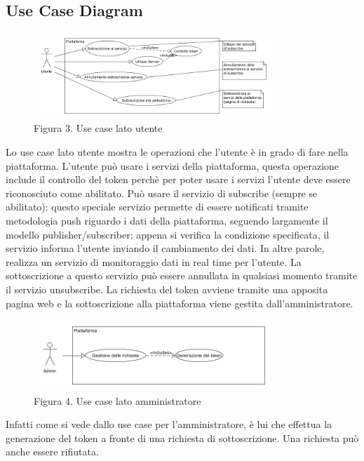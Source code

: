 \subsection{Use Case Diagram}
\begin{figure}[h]
	\centering
	\includegraphics[width=0.8\textwidth]{use-case-utente.png}
	\caption*{Figura 3. Use case lato utente}
\end{figure}
Lo use case lato utente mostra le operazioni che l’utente è in grado di fare nella piattaforma. L’utente può usare i servizi della piattaforma, questa operazione include il controllo del token perchè per poter usare i servizi l’utente deve essere riconosciuto come abilitato. Può usare il servizio di subscribe (sempre se abilitato): questo speciale servizio permette di essere notificati tramite metodologia push riguardo i dati della piattaforma, seguendo largamente il modello publisher/subscriber: appena si verifica la condizione specificata, il servizio informa l’utente inviando il cambiamento dei dati. In altre parole, realizza un servizio di monitoraggio dati in real time per l’utente. La sottoscrizione a questo servizio può essere annullata in qualsiasi momento tramite il servizio unsubscribe. La richiesta del token avviene tramite una apposita pagina web e la sottoscrizione alla piattaforma viene gestita dall’amministratore.

\begin{figure}[h]
	\centering
	\includegraphics[width=0.8\textwidth]{use-case-admin.png}
	\caption*{Figura 4. Use case lato amministratore}
\end{figure}

Infatti come si vede dallo use case per l’amministratore, è lui che effettua la generazione del token a fronte di una richiesta di sottoscrizione. Una richiesta può anche essere rifiutata.
\clearpage
